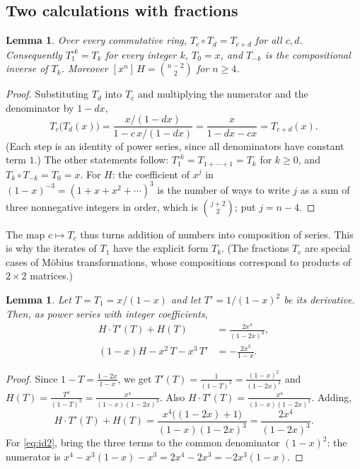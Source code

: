\documentclass[11pt,a4paper]{article}
\newtheorem{lemma}[theorem]{Lemma}
\theoremstyle{definition}
\theoremstyle{remark}
\newcommand{\coeff}[2]{[x^{#1}]\,#2}
\begin{document}
\subsection{Two calculations with fractions}

\begin{lemma}\label{lem:mobius}
Over every commutative ring, $T_c\circ T_d=T_{c+d}$ for all $c,d$. Consequently $T_1^{\circ k}=T_k$ for every integer
$k$, $T_0=x$, and $T_{-k}$ is the compositional inverse of $T_k$. Moreover $\coeff{n}{H}=\binom{n-2}{2}$ for $n\ge4$.
\end{lemma}

\begin{proof}
Substituting $T_d$ into $T_c$ and multiplying the numerator and the denominator by $1-dx$,
\[
T_c\bigl(T_d(x)\bigr)=\frac{x/(1-dx)}{1-c\,x/(1-dx)}=\frac{x}{1-dx-cx}=T_{c+d}(x).
\]
(Each step is an identity of power series, since all denominators have constant term $1$.) The other statements
follow: $T_1^{\circ k}=T_{1+\cdots+1}=T_k$ for $k\ge0$, and $T_k\circ T_{-k}=T_0=x$. For $H$: the coefficient of $x^j$
in $(1-x)^{-3}=(1+x+x^2+\cdots)^3$ is the number of ways to write $j$ as a sum of three nonnegative integers in order,
which is $\binom{j+2}{2}$; put $j=n-4$.
\end{proof}

The map $c\mapsto T_c$ thus turns addition of numbers into composition of series. This is why the iterates of $T_1$
have the explicit form $T_k$. (The fractions $T_c$ are special cases of M\"obius transformations, whose compositions correspond to
products of $2\times2$ matrices.)

\begin{lemma}\label{lem:ident}
Let $T=T_1=x/(1-x)$ and let $T'=1/(1-x)^2$ be its derivative. Then, as power series with integer coefficients,
\begin{align}
H\cdot T'(T)+H(T)&=\frac{2x^4}{(1-2x)^3},\label{eq:id1}\\
(1-x)H-x^2\,T-x^3\,T'&=-\frac{2x^3}{1-x}.\label{eq:id2}
\end{align}
\end{lemma}

\begin{proof}
Since $1-T=\frac{1-2x}{1-x}$, we get $T'(T)=\frac{1}{(1-T)^2}=\frac{(1-x)^2}{(1-2x)^2}$ and
$H(T)=\frac{T^4}{(1-T)^3}=\frac{x^4}{(1-x)(1-2x)^3}$. Also $H\cdot T'(T)=\frac{x^4}{(1-x)(1-2x)^2}$. Adding,
\[
H\cdot T'(T)+H(T)=\frac{x^4\bigl((1-2x)+1\bigr)}{(1-x)(1-2x)^3}=\frac{2x^4}{(1-2x)^3}.
\]
For \eqref{eq:id2}, bring the three terms to the common denominator $(1-x)^2$: the numerator is
$x^4-x^3(1-x)-x^3=2x^4-2x^3=-2x^3(1-x)$.
\end{proof}
\end{document}
